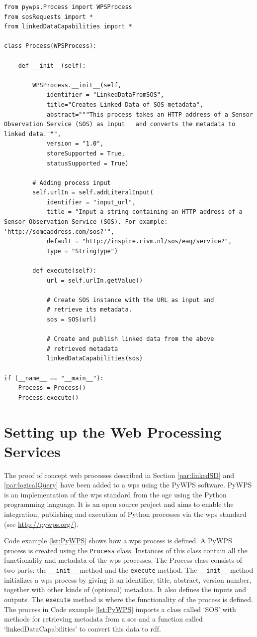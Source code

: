 \begin{lstlisting}[float,caption={Script that defines a web proces using PyWPS}, label={lst:PyWPS}]
from pywps.Process import WPSProcess
from sosRequests import *
from linkedDataCapabilities import *

class Process(WPSProcess):

	def __init__(self):

		WPSProcess.__init__(self,
			identifier = "LinkedDataFromSOS",
			title="Creates Linked Data of SOS metadata",
			abstract="""This process takes an HTTP address of a Sensor Observation Service (SOS) as input 	and converts the metadata to linked data.""",
			version = "1.0",
			storeSupported = True,
			statusSupported = True)

		# Adding process input
		self.urlIn = self.addLiteralInput(
			identifier = "input_url", 
			title = "Input a string containing an HTTP address of a Sensor Observation Service (SOS). For example: 'http://someaddress.com/sos?'", 
			default = "http://inspire.rivm.nl/sos/eaq/service?", 
			type = "StringType")

		def execute(self):
			url = self.urlIn.getValue()

			# Create SOS instance with the URL as input and 
			# retrieve its metadata.  
			sos = SOS(url)

			# Create and publish linked data from the above 
			# retrieved metadata
			linkedDataCapabilities(sos)

if (__name__ == "__main__"):
	Process = Process()
	Process.execute()
\end{lstlisting}

\section{Setting up the Web Processing Services}
\label{impl:wps}

The proof of concept web processes described in Section \ref{par:linkedSD} and \ref{par:logicalQuery} have been added to a \ac{wps} using the PyWPS software. PyWPS is an implementation of the \acl{wps} standard from the \acl{ogc} using the Python programming language. It is an open source project and aims to enable the integration, publishing and execution of Python processes via the \ac{wps} standard (see \url{http://pywps.org/}).  

Code example \ref{lst:PyWPS} shows how a \ac{wps} process is defined. A PyWPS process is created using the \texttt{Process} class. Instances of this class contain all the functionality and metadata of the \ac{wps} processes. The Process class consists of two parts: the \texttt{\_\_init\_\_} method and the \texttt{execute} method. The \texttt{\_\_init\_\_} method initializes a \ac{wps} process by giving it an identifier, title, abstract, version number, together with other kinds of (optional) metadata. It also defines the inputs and outputs. The \texttt{execute} method is where the functionality of the process is defined. The process in Code example \ref{lst:PyWPS} imports a class called `SOS' with methods for retrieving metadata from a \acl{sos} and a function called `linkedDataCapabilities' to convert this data to \ac{rdf}.

